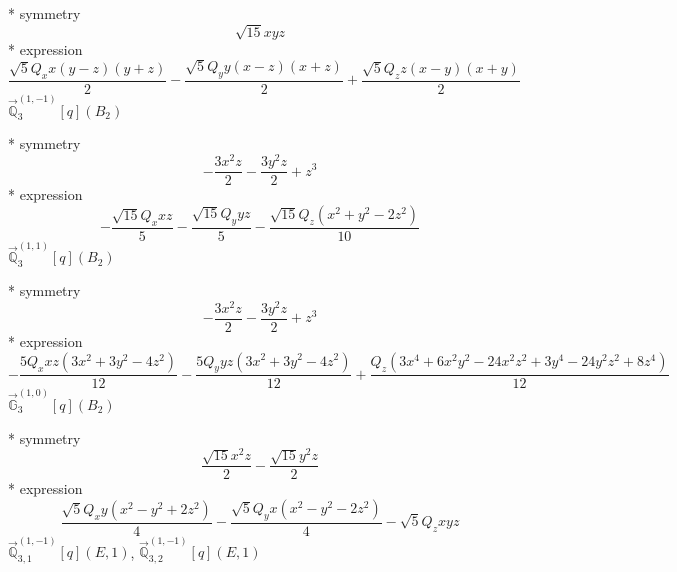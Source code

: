 \documentclass[fleqn,8pt]{jsarticle}
\begin{document}
\noindent\quad ** symmetry
\begin{dmath*}
\sqrt{15} x y z
\end{dmath*}
\noindent\quad ** expression
\begin{dmath*}
\frac{\sqrt{5} Q_{x} x \left(y - z\right) \left(y + z\right)}{2} - \frac{\sqrt{5} Q_{y} y \left(x - z\right) \left(x + z\right)}{2} + \frac{\sqrt{5} Q_{z} z \left(x - y\right) \left(x + y\right)}{2}
\end{dmath*}
\noindent\quad $\vec{\mathbb{Q}}_{3}^{(1,-1)}[q](B_{2})$

\noindent\quad ** symmetry
\begin{dmath*}
- \frac{3 x^{2} z}{2} - \frac{3 y^{2} z}{2} + z^{3}
\end{dmath*}
\noindent\quad ** expression
\begin{dmath*}
- \frac{\sqrt{15} Q_{x} x z}{5} - \frac{\sqrt{15} Q_{y} y z}{5} - \frac{\sqrt{15} Q_{z} \left(x^{2} + y^{2} - 2 z^{2}\right)}{10}
\end{dmath*}
\noindent\quad $\vec{\mathbb{Q}}_{3}^{(1,1)}[q](B_{2})$

\noindent\quad ** symmetry
\begin{dmath*}
- \frac{3 x^{2} z}{2} - \frac{3 y^{2} z}{2} + z^{3}
\end{dmath*}
\noindent\quad ** expression
\begin{dmath*}
- \frac{5 Q_{x} x z \left(3 x^{2} + 3 y^{2} - 4 z^{2}\right)}{12} - \frac{5 Q_{y} y z \left(3 x^{2} + 3 y^{2} - 4 z^{2}\right)}{12} + \frac{Q_{z} \left(3 x^{4} + 6 x^{2} y^{2} - 24 x^{2} z^{2} + 3 y^{4} - 24 y^{2} z^{2} + 8 z^{4}\right)}{12}
\end{dmath*}
\noindent\quad $\vec{\mathbb{G}}_{3}^{(1,0)}[q](B_{2})$

\noindent\quad ** symmetry
\begin{dmath*}
\frac{\sqrt{15} x^{2} z}{2} - \frac{\sqrt{15} y^{2} z}{2}
\end{dmath*}
\noindent\quad ** expression
\begin{dmath*}
\frac{\sqrt{5} Q_{x} y \left(x^{2} - y^{2} + 2 z^{2}\right)}{4} - \frac{\sqrt{5} Q_{y} x \left(x^{2} - y^{2} - 2 z^{2}\right)}{4} - \sqrt{5} Q_{z} x y z
\end{dmath*}
\noindent\quad $\vec{\mathbb{Q}}_{3,1}^{(1,-1)}[q](E,1)$, $\vec{\mathbb{Q}}_{3,2}^{(1,-1)}[q](E,1)$
\end{document}
